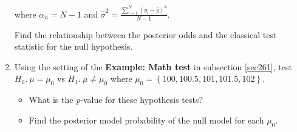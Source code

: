 \begin{enumerate}
where $\alpha_n=N-1$ and $\hat{\sigma}^2=\frac{\sum_{i=1}^N (y_i-\bar{y})^2}{N-1}$.

Find the relationship between the posterior odds and the classical test statistic for the null hypothesis.  

\item Using the setting of the \textbf{Example: Math test} in subsection \ref{sec261}, test $H_0. \ \mu=\mu_0$ vs $H_1. \ \mu \neq \mu_0$ where $\mu_0=\left\{100, 100.5, 101, 101.5, 102 \right\}$.

\begin{itemize}
	\item What is the \textit{p}-value for these hypothesis tests?
	\item Find the posterior model probability of the null model for each $\mu_0$.
\end{itemize} 

\end{enumerate}





